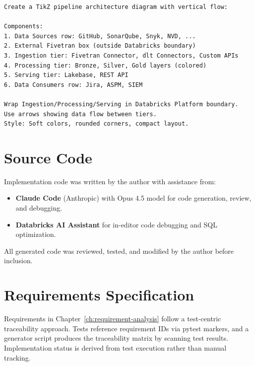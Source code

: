 \begin{lstlisting}[frame=single, backgroundcolor=\color{backcolour}, rulecolor=\color{framecolour}, basicstyle=\small\ttfamily, breaklines=true]
Create a TikZ pipeline architecture diagram with vertical flow:

Components:
1. Data Sources row: GitHub, SonarQube, Snyk, NVD, ...
2. External Fivetran box (outside Databricks boundary)
3. Ingestion tier: Fivetran Connector, dlt Connectors, Custom APIs
4. Processing tier: Bronze, Silver, Gold layers (colored)
5. Serving tier: Lakebase, REST API
6. Data Consumers row: Jira, ASPM, SIEM

Wrap Ingestion/Processing/Serving in Databricks Platform boundary.
Use arrows showing data flow between tiers.
Style: Soft colors, rounded corners, compact layout.
\end{lstlisting}

\section{Source Code}

Implementation code was written by the author with assistance from:

\begin{itemize}
    \item \textbf{Claude Code} (Anthropic) with Opus 4.5 model for code generation, review, and debugging.
    \item \textbf{Databricks AI Assistant} for in-editor code debugging and SQL optimization.
\end{itemize}

All generated code was reviewed, tested, and modified by the author before inclusion.

\section{Requirements Specification}

Requirements in Chapter~\ref{ch:requirement-analysis} follow a test-centric traceability approach. Tests reference requirement IDs via pytest markers, and a generator script produces the traceability matrix by scanning test results. Implementation status is derived from test execution rather than manual tracking.